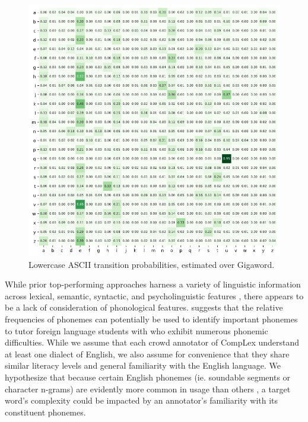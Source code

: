 \documentclass{dcthesis}
\theoremstyle{definition}
\theoremstyle{remark}
\begin{document}
\begin{figure}
  \centering
  \includegraphics[scale=0.55]{character_transition_probabilities.png}
  \captionsetup{justification=centering}
  \caption{\label{fig:character_transition_probabilities} Lowercase ASCII transition probabilities, estimated over Gigaword.}
\end{figure}

While prior top-performing approaches harness a variety of linguistic information across lexical, semantic, syntactic, and psycholinguistic features \citep{paetzold2016sv000gg, ronzano2016taln, mukherjee2016ju_nlp}, there appears to be a lack of consideration of phonological features. \citet{hayden1950relative} suggests that the relative frequencies of phonemes can potentially be used to identify important phonemes to tutor foreign language students with who exhibit numerous phonemic difficulties. While we assume that each crowd annotator of CompLex understand at least one dialect of English, we also assume for convenience that they share similar literacy levels and general familiarity with the English language. We hypothesize that because certain English phonemes (ie. soundable segments or character n-grams) are evidently more common in usage than others \citep{hayden1950relative}, a target word's complexity could be impacted by an annotator's familiarity with its constituent phonemes.
\end{document}
